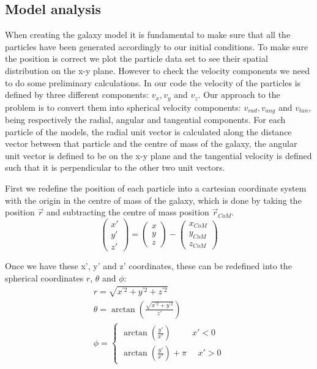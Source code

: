 \documentclass[a4paper,12pt, english]{article}
\begin{document}
\subsection{Model analysis}
\label{model-analysis}
When creating the galaxy model it is fundamental to make sure that all the particles have been generated accordingly to our initial conditions. To make sure the position is correct we plot the particle data set to see their spatial distribution on the x-y plane. However to check the velocity components we need to do some preliminary calculations. In our code the velocity of the particles is defined by three different components: $v_x, v_y$ and $v_z$. Our approach to the problem is to convert them into spherical velocity components: $v_{rad}, v_{ang}$ and $v_{tan}$, being respectively the radial, angular and tangential components. For each particle of the models, the radial unit vector is calculated along the distance vector between that particle and the centre of mass of the galaxy, the angular unit vector is defined to be on the x-y plane and the tangential velocity is defined such that it is perpendicular to the other two unit vectors.\par
\smallskip
First we redefine the position of each particle into a cartesian coordinate system with the origin in the centre of mass of the galaxy, which is done by taking the position $\vec{r}$ and subtracting the centre of mass position $\vec{r}_{CoM}$.
\begin{equation}
    \begin{pmatrix}
    x'\\y'\\z'
    \end{pmatrix}
    = 
    \begin{pmatrix}
    x\\y\\z
    \end{pmatrix}
    - 
    \begin{pmatrix}
    x_{CoM}\\y_{CoM}\\z_{CoM}
    \end{pmatrix}
\end{equation}\par
\smallskip
Once we have these x', y' and z' coordinates, these can be redefined into the spherical coordinates \(r\), \(\theta\) and \(\phi\):
\begin{equation}
\begin{gathered}
    r = \sqrt{x^{\prime2} + y^{\prime2} + z^{\prime2} }\\
    \theta = \arctan \left( \frac{\sqrt{x^{\prime2} + y^{\prime2}}}{z'} \right)\\ 
    \phi = \left\{ \begin{array}{ll}
             \arctan\left(\frac{y'}{x'}\right)\ \ \ \ \ \ \ \ \ \ \  x' < 0 \\
            \arctan\left(\frac{y'}{x'}\right) + \pi \ \ \ \ \ \  x' > 0 
        \end{array} \right.
\end{gathered}
\end{equation}\par
\end{document}
